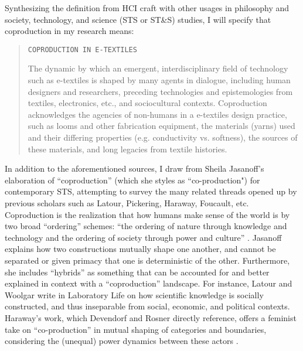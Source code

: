 Synthesizing the definition from HCI craft with other usages in philosophy and society, technology, and science (STS or ST\&S) studies, I will specify that coproduction in my research means:

  \begin{quote}
    
  \texttt{COPRODUCTION IN E-TEXTILES}

  The dynamic by which an emergent, interdisciplinary field of technology such as e-textiles is shaped by many agents in dialogue, including human designers and researchers, preceding technologies and epistemologies from textiles, electronics, etc., and sociocultural contexts. Coproduction acknowledges the agencies of non-humans in a e-textiles design practice, such as looms and other fabrication equipment, the materials (yarns) used and their differing properties (e.g. conductivity vs. softness), the sources of these materials, and long legacies from textile histories.
  \end{quote}

\noindent{}In addition to the aforementioned sources, I draw from Sheila Jasanoff's elaboration of ``coproduction'' (which she styles as ``co-production") for contemporary STS, attempting to survey the many related threads opened up by previous scholars such as Latour, Pickering, Haraway, Foucault, etc. Coproduction is the realization that how humans make sense of the world is by two broad ``ordering'' schemes: ``the ordering of nature through knowledge and technology and the ordering of society through power and culture'' \cite{jasanoff_states_2010}. Jasanoff explains how two constructions mutually shape one another, and cannot be separated or given primacy that one is deterministic of the other. Furthermore, she includes ``hybrids'' as something that can be accounted for and better explained in context with a ``coproduction'' landscape. For instance, Latour and Woolgar write in Laboratory Life \cite{latour_laboratory_2013} on how scientific knowledge is socially constructed, and thus inseparable from social, economic, and political contexts. Haraway's work, which Devendorf and Rosner directly reference, offers a feminist take on ``co-production'' in mutual shaping of categories and boundaries, considering the (unequal) power dynamics between these actors \cite{haraway_staying_2016}. 

